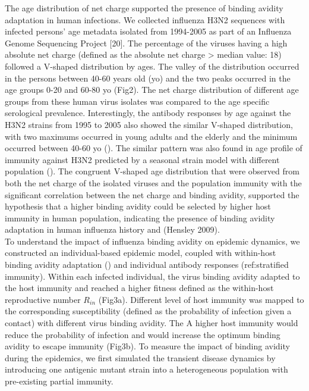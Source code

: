 \documentclass[12pt,a4paper]{article}
\begin{document}
The age distribution of net charge supported the presence of binding avidity adaptation in human infections. We collected influenza H3N2 sequences with infected persons’ age metadata isolated from 1994-2005 as part of an Influenza Genome Sequencing Project  [20]. The percentage of the viruses having a high absolute net charge (defined as the absolute net charge > median value: 18) followed a V-shaped distribution by ages. The valley of the distribution occurred in the persons between 40-60 years old (yo) and the two peaks occurred in the age groups 0-20 and 60-80 yo (Fig2). The net charge distribution of different age groups from these human virus isolates was compared to the age specific serological prevalence. Interestingly, the antibody responses by age against the H3N2 strains from 1995 to 2005 also showed the similar V-shaped distribution, with two maximums occurred in young adults and the elderly and the minimum occurred between 40-60 yo (\cite{Kucharski2015a}). The similar pattern was also found in age profile of immunity against H3N2 predicted by a seasonal strain model with different population (\cite{Kucharski2012}). The congruent V-shaped age distribution that were observed from both the net charge of the isolated viruses and the population immunity with the significant correlation between the net charge and binding avidity, supported the hypothesis that a higher binding avidity could be selected by higher host immunity in human population, indicating the presence of binding avidity adaptation in human influenza history and (Hensley 2009).  \\
To understand the impact of influenza binding avidity on epidemic dynamics, we constructed an individual-based epidemic model, coupled with within-host binding avidity adaptation (\cite{Yuan2013a}) and individual antibody responses (ref:stratified immunity). Within each infected individual, the virus binding avidity adapted to the host immunity and reached a higher fitness defined as the within-host reproductive number $R_{in}$ (Fig3a). Different level of host immunity was mapped to the corresponding susceptibility (defined as the probability of infection given a contact) with different virus binding avidity. The A higher host immunity would reduce the probability of infection and would increase the optimum binding avidity to escape immunity (Fig3b). To measure the impact of binding avidity during the epidemics, we first simulated the transient disease dynamics by introducing one antigenic mutant strain into a heterogeneous population with pre-existing partial immunity. \\
\end{document}
